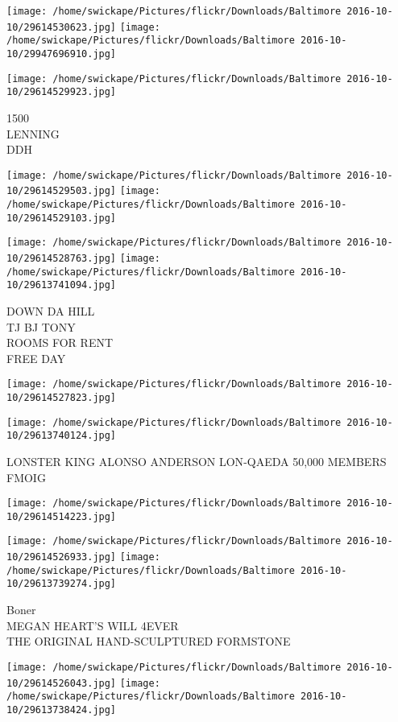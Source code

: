\documentclass[10pt,letterpaper]{article}
\begin{document}
\texttt{[image: /home/swickape/Pictures/flickr/Downloads/Baltimore 2016-10-10/29614530623.jpg]}
\texttt{[image: /home/swickape/Pictures/flickr/Downloads/Baltimore 2016-10-10/29947696910.jpg]}

\vspace{0.25in}
\texttt{[image: /home/swickape/Pictures/flickr/Downloads/Baltimore 2016-10-10/29614529923.jpg]}

1500\\
LENNING\\
DDH
\pagebreak

\texttt{[image: /home/swickape/Pictures/flickr/Downloads/Baltimore 2016-10-10/29614529503.jpg]}
\texttt{[image: /home/swickape/Pictures/flickr/Downloads/Baltimore 2016-10-10/29614529103.jpg]}

\texttt{[image: /home/swickape/Pictures/flickr/Downloads/Baltimore 2016-10-10/29614528763.jpg]}
\texttt{[image: /home/swickape/Pictures/flickr/Downloads/Baltimore 2016-10-10/29613741094.jpg]}

DOWN DA HILL\\
TJ BJ TONY\\
ROOMS FOR RENT\\
FREE DAY
\pagebreak

\texttt{[image: /home/swickape/Pictures/flickr/Downloads/Baltimore 2016-10-10/29614527823.jpg]}

\vspace{0.25in}
\texttt{[image: /home/swickape/Pictures/flickr/Downloads/Baltimore 2016-10-10/29613740124.jpg]}

LONSTER KING ALONSO ANDERSON LON{-}QAEDA 50,000 MEMBERS\\
FMOIG
\pagebreak

\texttt{[image: /home/swickape/Pictures/flickr/Downloads/Baltimore 2016-10-10/29614514223.jpg]}

\vspace{0.25in}
\texttt{[image: /home/swickape/Pictures/flickr/Downloads/Baltimore 2016-10-10/29614526933.jpg]}
\texttt{[image: /home/swickape/Pictures/flickr/Downloads/Baltimore 2016-10-10/29613739274.jpg]}

Boner\\
MEGAN HEART'S WILL 4EVER\\
THE ORIGINAL HAND{-}SCULPTURED FORMSTONE
\pagebreak

\texttt{[image: /home/swickape/Pictures/flickr/Downloads/Baltimore 2016-10-10/29614526043.jpg]}
\texttt{[image: /home/swickape/Pictures/flickr/Downloads/Baltimore 2016-10-10/29613738424.jpg]}
\end{document}
